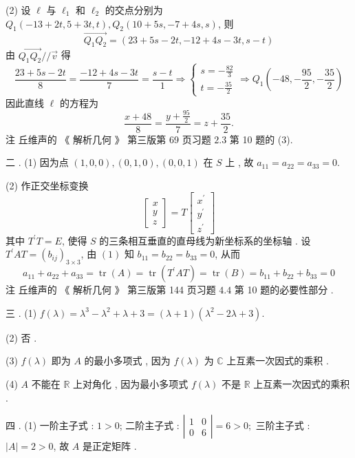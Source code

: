\documentclass[10pt]{article}
\begin{document}
(2)  设  $\ell$  与  $\ell_{1}$  和  $\ell_{2}$  的交点分别为  $Q_{1}(-13+2 t, 5+3 t, t), Q_{2}(10+5 s,-7+4 s, s)$,  则 
$$
\overrightarrow{Q_{1} Q_{2}}=(23+5 s-2 t,-12+4 s-3 t, s-t)
$$
 由  $\overrightarrow{Q_{1} Q_{2}} / / \vec{v}$  得 
$$
\frac{23+5 s-2 t}{8}=\frac{-12+4 s-3 t}{7}=\frac{s-t}{1} \Longrightarrow\left\{\begin{array}{l}
s=-\frac{82}{3} \\
t=-\frac{35}{2}
\end{array} \Longrightarrow Q_{1}\left(-48,-\frac{95}{2},-\frac{35}{2}\right)\right.
$$
 因此直线  $\ell$  的方程为 
$$
\frac{x+48}{8}=\frac{y+\frac{95}{2}}{7}=z+\frac{35}{2} .
$$
 注   丘维声的 《 解析几何 》 第三版第  69  页习题  $2.3$  第  10  题的  (3).

 二 . (1)  因为点  $(1,0,0),(0,1,0),(0,0,1)$  在  $S$  上 ,  故  $a_{11}=a_{22}=a_{33}=0$.

(2)  作正交坐标变换 
$$
\left[\begin{array}{l}
x \\
y \\
z
\end{array}\right]=T\left[\begin{array}{l}
x^{\prime} \\
y^{\prime} \\
z^{\prime}
\end{array}\right]
$$
 其中  $T^{\prime} T=E$,  使得  $S$  的三条相互垂直的直母线为新坐标系的坐标轴 .  设  $T^{\prime} A T=\left(b_{i j}\right)_{3 \times 3}$,  由  $(1)$  知  $b_{11}=b_{22}=b_{33}=0$,  从而 
$$
a_{11}+a_{22}+a_{33}=\operatorname{tr}(A)=\operatorname{tr}\left(T^{\prime} A T\right)=\operatorname{tr}(B)=b_{11}+b_{22}+b_{33}=0
$$
 注   丘维声的 《 解析几何 》 第三版第  144  页习题  $4.4$  第  10  题的必要性部分 .

 三 . (1) $f(\lambda)=\lambda^{3}-\lambda^{2}+\lambda+3=(\lambda+1)\left(\lambda^{2}-2 \lambda+3\right)$.

(2)  否 .

(3) $f(\lambda)$  即为  $A$  的最小多项式 ,  因为  $f(\lambda)$  为  $\mathbb{C}$  上互素一次因式的乘积 .

(4) $A$  不能在  $\mathbb{R}$  上对角化 ,  因为最小多项式  $f(\lambda)$  不是  $\mathbb{R}$  上互素一次因式的乘积 .

 四 . (1)  一阶主子式 : $1>0$; 二阶主子式 : $\left|\begin{array}{ll}1 & 0 \\ 0 & 6\end{array}\right|=6>0 ;$  三阶主子式 : $|A|=2>0$,  故  $A$  是正定矩阵 .
\end{document}
